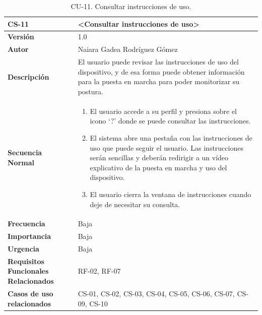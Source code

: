 \begin{table}[h!]
\centering
\begin{tabular}{ |m{3cm}|m{11cm}|  } 
\hline
\cellcolor[HTML]{B9E3F0}\textbf{CS-11} & \cellcolor[HTML]{B9E3F0}\textbf{<Consultar instrucciones de uso>}\\

\hline
\cellcolor[HTML]{EFEFEF}\textbf{Versión}             & 1.0  \\
\hline
\cellcolor[HTML]{EFEFEF}\textbf{Autor}                & Naiara Gadea Rodríguez Gómez\\
\hline
\cellcolor[HTML]{EFEFEF}\textbf{Descripción}                & {El usuario puede revisar las instrucciones de uso del dispositivo, y de esa forma puede obtener información para la puesta en marcha para poder monitorizar su postura.}\\
\hline
\cellcolor[HTML]{EFEFEF}\textbf{Secuencia \newline Normal}                &                 
        \begin{enumerate}
			\def\labelenumi{\arabic{enumi}.}
			\tightlist
			\item El usuario accede a su perfil y presiona sobre el icono ‘?’ donde se puede consultar las instrucciones.
			\item El sistema abre una pestaña con las instrucciones de uso que puede seguir el usuario. Las instrucciones serán sencillas y deberán redirigir a un vídeo explicativo de la puesta en marcha y uso del dispositivo.
                \item El usuario cierra la ventana de instrucciones cuando deje de necesitar su consulta. 
		\end{enumerate}\\
\hline
\cellcolor[HTML]{EFEFEF}\textbf{Frecuencia}                & Baja\\
\hline
\cellcolor[HTML]{EFEFEF}\textbf{Importancia}                & Baja\\
\hline
\cellcolor[HTML]{EFEFEF}\textbf{Urgencia}                & Baja\\
\hline
\cellcolor[HTML]{EFEFEF}\textbf{Requisitos Funcionales Relacionados}                & {RF-02, RF-07}\\
\hline
\cellcolor[HTML]{EFEFEF}\textbf{Casos de uso relacionados}                & {CS-01, CS-02, CS-03, CS-04, CS-05, CS-06, CS-07, CS-09, CS-10 }\\
\hline
\end{tabular}
\caption{CU-11. Consultar instrucciones de uso.}
\end{table}


